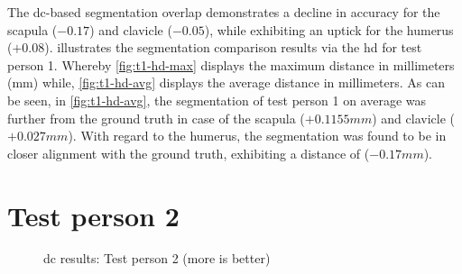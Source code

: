 The \acrshort{dc}-based segmentation overlap demonstrates a decline in accuracy for the scapula ($−0.17$) and clavicle ($−0.05$), while exhibiting an uptick for the humerus ($+0.08$).
 illustrates the segmentation comparison results via the \acrfull{hd} for test person 1.
Whereby \cref{fig:t1-hd-max} displays the maximum distance in millimeters (mm) while, \cref{fig:t1-hd-avg} displays the average distance in millimeters.
As can be seen, in \cref{fig:t1-hd-avg}, the segmentation of test person 1 on average was further from the ground truth in case of the scapula ($+0.1155 mm$) and clavicle ($+0.027 mm$).
With regard to the humerus, the segmentation was found to be in closer alignment with the ground truth, exhibiting a distance of ($−0.17mm$).


\section{Test person 2}\label{s:result-2}
\begin{figure}[h!]
	\begin{center}
		\caption{\acrshort{dc} results: Test person 2 (more is better)}\label{fig:dcs-tester2}
	\end{center}
\end{figure}
